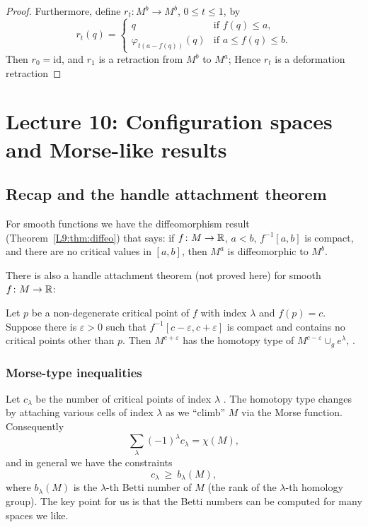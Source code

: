 \begin{proof}
Furthermore, define $r_t\colon M^b\to M^b$, $0\le t\le 1$, by
\[
  r_t(q)=\begin{cases}
    q & \text{if } f(q)\le a,\\
    \varphi_{t(a-f(q))}(q) & \text{if } a\le f(q)\le b.
  \end{cases}
\]
Then $r_0=\mathrm{id}$, and $r_1$ is a retraction from $M^b$ to $M^a$;  Hence $r_t$ is a deformation retraction
\end{proof}

\chapter{Lecture 10: Configuration spaces and Morse-like results}
\label{L10:chap}

\section{Recap and the handle attachment theorem}
\label{L10:sec:recap}

For smooth functions we have the diffeomorphism result (Theorem~\ref{L9:thm:diffeo}) that says:
if $f\colon M\to\mathbb{R}$, $a<b$, $f^{-1}[a,b]$ is compact, and there are no critical values in $[a,b]$,
then $M^a$ is diffeomorphic to $M^b$.

There is also a handle attachment theorem (not proved here) for smooth $f\colon M\to\mathbb{R}$:

\begin{theorem}
\label{L10:thm:handle}
Let $p$ be a non-degenerate critical point of $f$ with index $\lambda$ and $f(p)=c$.
Suppose there is $\varepsilon>0$ such that $f^{-1}[c-\varepsilon,c+\varepsilon]$ is compact and
contains no critical points other than $p$. Then $M^{c+\varepsilon}$ has the homotopy type of
$M^{c-\varepsilon}\cup_g e^\lambda$, .
\end{theorem}

\subsection*{Morse-type inequalities}
Let $c_\lambda$ be the number of critical points of index $\lambda$ . The homotopy type changes by attaching various cells of index $\lambda$ as we
``climb'' $M$ via the Morse function. Consequently
\[
  \sum_\lambda(-1)^\lambda c_\lambda=\chi(M),
\]
and in general we have the constraints
\[
  c_\lambda\ \ge\ b_\lambda(M),
\]
where $b_\lambda(M)$ is the $\lambda$-th Betti number of $M$ (the rank of the $\lambda$-th homology group).
The key point for us is that the Betti numbers can be computed for many spaces we like.

